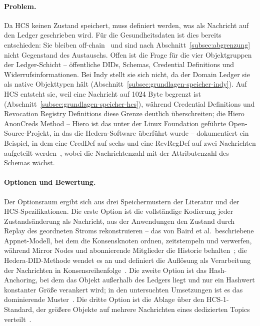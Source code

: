 \paragraph{Problem.}
Da HCS keinen Zustand speichert, muss definiert werden, was als Nachricht auf den Ledger geschrieben wird. Für die Gesundheitsdaten ist dies bereits entschieden: Sie bleiben off-chain~\cite{erler2023} und sind nach Abschnitt~\ref{subsec:abgrenzung} nicht Gegenstand des Austauschs. Offen ist die Frage für die vier Objektgruppen der Ledger-Schicht -- öffentliche DIDs, Schemas, Credential Definitions und Widerrufsinformationen. Bei Indy stellt sie sich nicht, da der Domain Ledger sie als native Objekttypen hält (Abschnitt~\ref{subsec:grundlagen-speicher-indy}). Auf HCS entsteht sie, weil eine Nachricht auf 1024 Byte begrenzt ist (Abschnitt~\ref{subsec:grundlagen-speicher-hcs}), während Credential Definitions und Revocation Registry Definitions diese Grenze deutlich überschreiten; die Hiero AnonCreds Method -- Hiero ist das unter der Linux Foundation geführte Open-Source-Projekt, in das die Hedera-Software überführt wurde -- dokumentiert ein Beispiel, in dem eine CredDef auf sechs und eine RevRegDef auf zwei Nachrichten aufgeteilt werden~\cite{hieroanoncreds}, wobei die Nachrichtenzahl mit der Attributenzahl des Schemas wächst.

\paragraph{Optionen und Bewertung.}
Der Optionsraum ergibt sich aus drei Speichermustern der Literatur und der HCS-Spezifikationen. Die erste Option ist die vollständige Kodierung jeder Zustandsänderung als Nachricht, aus der Anwendungen den Zustand durch Replay des geordneten Stroms rekonstruieren -- das von Baird et al.\ beschriebene Appnet-Modell, bei dem die Konsensknoten ordnen, zeitstempeln und verwerfen, während Mirror Nodes und abonnierende Mitglieder die Historie behalten~\cite{bairdgross2019}; die Hedera-DID-Methode wendet es an und definiert die Auflösung als Verarbeitung der Nachrichten in Konsensreihenfolge~\cite{hasheddidmethod}. Die zweite Option ist das Hash-Anchoring, bei dem das Objekt außerhalb des Ledgers liegt und nur ein Hashwert konstanter Größe verankert wird; in den untersuchten Umsetzungen ist es das dominierende Muster~\cite{mazlan2020, farin2025, tawfik2025, mamoru2026}. Die dritte Option ist die Ablage über den HCS-1-Standard, der größere Objekte auf mehrere Nachrichten eines dedizierten Topics verteilt~\cite{hcs1standard}.

